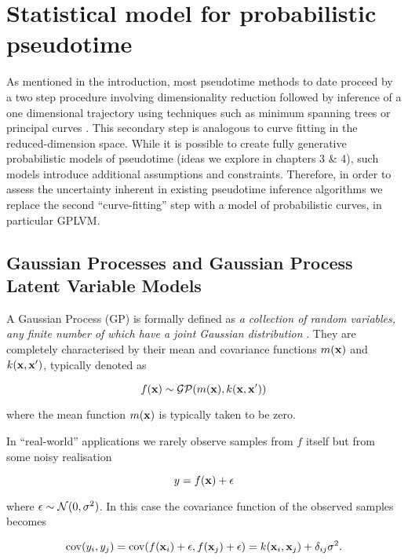 \section{Statistical model for probabilistic pseudotime}

As mentioned in the introduction, most pseudotime methods to date proceed by a two step procedure involving dimensionality reduction followed by inference of a one dimensional trajectory using techniques such as minimum spanning trees \cite{Trapnell2014-xi,Ji2016-gx} or principal curves \cite{Marco2014-ug,campbell2015laplacian,cannoodt2016scorpius}. This secondary step is analogous to curve fitting in the reduced-dimension space. While it is possible to create fully generative probabilistic models of pseudotime (ideas we explore in chapters 3 \& 4), such models introduce additional assumptions and constraints. Therefore, in order to assess the uncertainty inherent in existing pseudotime inference algorithms we replace the second ``curve-fitting'' step with a model of probabilistic curves, in particular GPLVM.

\subsection{Gaussian Processes and Gaussian Process Latent Variable Models}

A Gaussian Process (GP) is formally defined as \emph{a collection of random variables, any finite number of which have a joint Gaussian distribution} \cite{rasmussen2006gaussian}. They are completely characterised by their mean and covariance functions $m({\bf x})$ and $k({\bf x}, {\bf x}')$, typically denoted as

\begin{equation}
	f({\bf x}) \sim \mathcal{GP}(m({\bf x}), k({\bf x}, {\bf x}'))
\end{equation}

where the mean function $m({\bf x})$ is typically taken to be zero.

In ``real-world'' applications we rarely observe samples from $f$ itself but from some noisy realisation

\begin{equation}
	y = f({\bf x}) + \epsilon
\end{equation}

where $\epsilon \sim \mathcal{N}(0, \sigma^2)$. In this case the covariance function of the observed samples becomes

\begin{equation}
	\text{cov}(y_i, y_j) = \text{cov}(f({\bf x}_i) + \epsilon, f({\bf x}_j) + \epsilon) = k({\bf x}_i, {\bf x}_j) + \delta_{ij} \sigma^2.
\end{equation}


